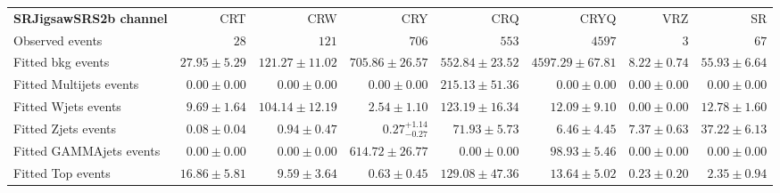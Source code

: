 

\begin{table}
\begin{center}
\setlength{\tabcolsep}{0.0pc}
{\tiny
\begin{tabular*}{\textwidth}{@{\extracolsep{\fill}}lrrrrrrr}
\noalign{\smallskip}\hline\noalign{\smallskip}
{\bf SRJigsawSRS2b channel}           & CRT            & CRW            & CRY            & CRQ            & CRYQ            & VRZ            & SR              \\[-0.05cm]
\noalign{\smallskip}\hline\noalign{\smallskip}
Observed events          & $28$              & $121$              & $706$              & $553$              & $4597$              & $3$              & $67$                    \\
\noalign{\smallskip}\hline\noalign{\smallskip}
Fitted bkg events         & $27.95 \pm 5.29$          & $121.27 \pm 11.02$          & $705.86 \pm 26.57$          & $552.84 \pm 23.52$          & $4597.29 \pm 67.81$          & $8.22 \pm 0.74$          & $55.93 \pm 6.64$              \\
\noalign{\smallskip}\hline\noalign{\smallskip}
        Fitted Multijets events         & $0.00 \pm 0.00$          & $0.00 \pm 0.00$          & $0.00 \pm 0.00$          & $215.13 \pm 51.36$          & $0.00 \pm 0.00$          & $0.00 \pm 0.00$          & $0.00 \pm 0.00$              \\
        Fitted Wjets events         & $9.69 \pm 1.64$          & $104.14 \pm 12.19$          & $2.54 \pm 1.10$          & $123.19 \pm 16.34$          & $12.09 \pm 9.10$          & $0.00 \pm 0.00$          & $12.78 \pm 1.60$              \\
        Fitted Zjets events         & $0.08 \pm 0.04$          & $0.94 \pm 0.47$          & $0.27_{-0.27}^{+1.14}$          & $71.93 \pm 5.73$          & $6.46 \pm 4.45$          & $7.37 \pm 0.63$          & $37.22 \pm 6.13$              \\
        Fitted GAMMAjets events         & $0.00 \pm 0.00$          & $0.00 \pm 0.00$          & $614.72 \pm 26.77$          & $0.00 \pm 0.00$          & $98.93 \pm 5.46$          & $0.00 \pm 0.00$          & $0.00 \pm 0.00$              \\
        Fitted Top events         & $16.86 \pm 5.81$          & $9.59 \pm 3.64$          & $0.63 \pm 0.45$          & $129.08 \pm 47.36$          & $13.64 \pm 5.02$          & $0.23 \pm 0.20$          & $2.35 \pm 0.94$              \\

\end{tabular*}}
\end{center}
\end{table}
